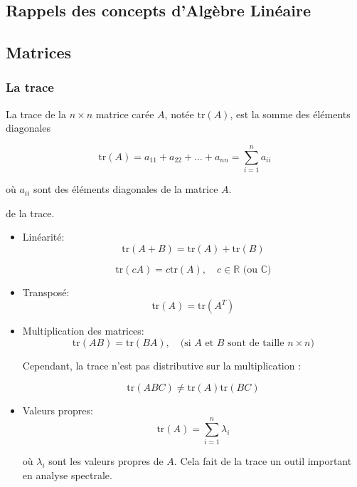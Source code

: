 \begin{appendices}
    \chapter{Rappels des concepts d'Algèbre Linéaire} 
    \section{Matrices}
    \subsection{La trace}
    \begin{definition}
        La trace de la \( n \times n \) matrice carée \( A \), notée \( \text{tr}(A) \), est la somme des éléments diagonales

        \[
            \text{tr}(A) = a_{11} + a_{22} + \dots + a_{nn} = \sum_{i=1}^{n} a_{ii}
        \]

        où \( a_{ii} \) sont des éléments diagonales de la matrice \( A \). 
    \end{definition}

    \begin{property} de la trace.
       \begin{itemize}
           \item Linéarité:
               \[
                   \text{tr}(A + B) = \text{tr}(A) + \text{tr}(B)
               \]

               \[
                   \text{tr}(cA) = c \text{tr}(A), \quad c \in \mathbb{R} \text{ (ou } \mathbb{C} \text{)}
               \]
            \item  Transposé:
                \[
                    \text{tr}(A) = \text{tr}(A^T)
                \] 
            \item Multiplication des matrices:
                \[
                    \text{tr}(AB) = \text{tr}(BA), \quad \text{(si } A \text{ et } B \text{ sont de taille } n \times n)
                \]

                Cependant, la trace n'est pas distributive sur la multiplication :

                \[
                    \text{tr}(A B C) \neq \text{tr}(A) \text{tr}(B C)
                \]
            \item Valeurs propres:
                \[
                    \text{tr}(A) = \sum_{i=1}^{n} \lambda_i
                \]

                où \( \lambda_i \) sont les valeurs propres de \( A \). Cela fait de la trace un outil important en analyse spectrale.


\end{itemize}
\end{property}
\end{appendices}
